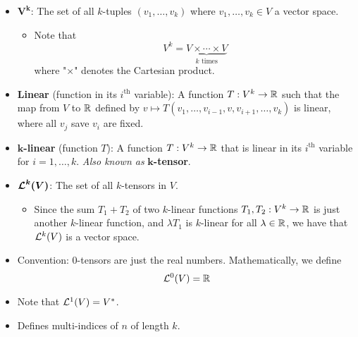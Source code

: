 \documentclass[../notes.tex]{subfiles}
\begin{document}
\begin{itemize}
\begin{proof}
        \begin{equation*}
            [A^*f_i^*](e_j) = \left[ \sum_{k=1}^nc_{k,i}e_k^* \right](e_j)
            = c_{j,i}
        \end{equation*}
        and
        \begin{equation*}
            [A^*f_i^*](e_j) = f_i^*(Ae_j)
            = f_i^*\left( \sum_{k=1}^ma_{k,j}f_k \right)
            = a_{i,j}
        \end{equation*}
        so transitivity implies the desired result.
    \end{proof}
    \item {}$\bm{V^k}$: The set of all $k$-tuples $(v_1,\dots,v_k)$ where $v_1,\dots,v_k\in V$ a vector space.
    \begin{itemize}
        \item Note that
        \begin{equation*}
            V^k = \underbrace{V\times\cdots\times V}_{k\text{ times}}
        \end{equation*}
        where "$\times$" denotes the Cartesian product.
    \end{itemize}
    \item \textbf{Linear} (function in its $i^\text{th}$ variable): A function $T:V^k\to\R$ such that the map from $V$ to $\R$ defined by $v\mapsto T(v_1,\dots,v_{i-1},v,v_{i+1},\dots,v_k)$ is linear, where all $v_j$ save $v_i$ are fixed.
    \item \textbf{$\bm{k}$-linear} (function $T$): A function $T:V^k\to\R$ that is linear in its $i^\text{th}$ variable for $i=1,\dots,k$. \emph{Also known as} \textbf{$\bm{k}$-tensor}.
    \item $\bm{\lin[k]{V}}$: The set of all $k$-tensors in $V$.
    \begin{itemize}
        \item Since the sum $T_1+T_2$ of two $k$-linear functions $T_1,T_2:V^k\to\R$ is just another $k$-linear function, and $\lambda T_1$ is $k$-linear for all $\lambda\in\R$, we have that $\lin[k]{V}$ is a vector space.
    \end{itemize}
    \item Convention: 0-tensors are just the real numbers. Mathematically, we define
    \begin{equation*}
        \lin[0]{V} = \R
    \end{equation*}
    \item Note that $\lin[1]{V}=V^*$.
    \item Defines multi-indices of $n$ of length $k$.

\end{itemize}
\end{document}
